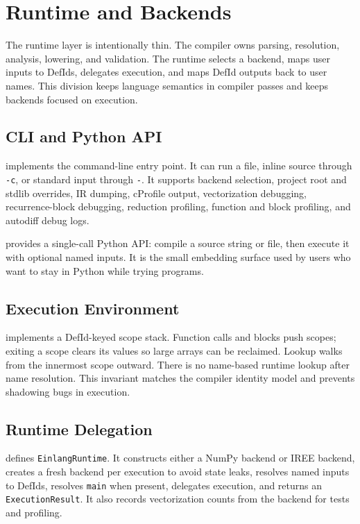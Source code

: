 \chapter{Runtime and Backends}

The runtime layer is intentionally thin. The compiler owns parsing, resolution,
analysis, lowering, and validation. The runtime selects a backend, maps user
inputs to DefIds, delegates execution, and maps DefId outputs back to user names.
This division keeps language semantics in compiler passes and keeps backends
focused on execution.

\section{CLI and Python API}

 implements the command-line entry point. It
can run a file, inline source through \texttt{-c}, or standard input through
\texttt{-}. It supports backend selection, project root and stdlib overrides,
IR dumping, cProfile output, vectorization debugging, recurrence-block
debugging, reduction profiling, function and block profiling, and autodiff
debug logs.

 provides a single-call Python API:
compile a source string or file, then execute it with optional named inputs. It
is the small embedding surface used by users who want to stay in Python while
trying \einlang{} programs.

\section{Execution Environment}

 implements a DefId-keyed scope
stack. Function calls and blocks push scopes; exiting a scope clears its values
so large arrays can be reclaimed. Lookup walks from the innermost scope outward.
There is no name-based runtime lookup after name resolution. This invariant
matches the compiler identity model and prevents shadowing bugs in execution.

\section{Runtime Delegation}

 defines \texttt{EinlangRuntime}. It
constructs either a NumPy backend or IREE backend, creates a fresh backend per
execution to avoid state leaks, resolves named inputs to DefIds, resolves
\texttt{main} when present, delegates execution, and returns an
\texttt{ExecutionResult}. It also records vectorization counts from the backend
for tests and profiling.

